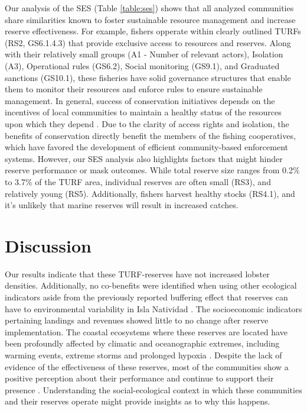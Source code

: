 \documentclass{frontiersSCNS}
\theoremstyle{definition}
\theoremstyle{definition}
\theoremstyle{definition}
\theoremstyle{remark}
\begin{document}
Our analysis of the SES (Table \ref{table:ses}) shows that all analyzed
communities share similarities known to foster sustainable resource
management and increase reserve effectiveness. For example, fishers
opperate within clearly outlined TURFs (RS2, GS6.1.4.3) that provide
exclusive access to resources and reserves. Along with their relatively
small groups (A1 - Number of relevant actors), Isolation (A3),
Operational rules (GS6.2), Social monitoring (GS9.1), and Graduated
sanctions (GS10.1), these fisheries have solid governance structures
that enable them to monitor their resources and enforce rules to ensure
sustainable management. In general, success of conservation initiatives
depends on the incentives of local communities to maintain a healthy
status of the resources upon which they depend \citep{jupiter_2017}. Due
to the clarity of access rights and isolation, the benefits of
conservation directly benefit the members of the fishing cooperatives,
which have favored the development of efficient community-based
enforcement systems. However, our SES analysis also highlights factors
that might hinder reserve performance or mask outcomes. While total
reserve size ranges from 0.2\% to 3.7\% of the TURF area, individual
reserves are often small (RS3), and relatively young (RS5).
Additionally, fishers harvest healthy stocks (RS4.1), and it's unlikely
that marine reserves will result in increased catches.

\section{Discussion}\label{discussion}

Our results indicate that these TURF-reserves have not increased lobster
densities. Additionally, no co-benefits were identified when using other
ecological indicators aside from the previously reported buffering
effect that reserves can have to environmental variability in Isla
Natividad \citep{micheli_2012-EU}. The socioeconomic indicators
pertaining landings and revenues showed little to no change after
reserve implementation. The coastal ecosystems where these reserves are
located have been profoundly affected by climatic and oceanographic
extremes, including warming events, extreme storms and prolonged hypoxia
\citep{micheli_2012-EU,woodson}. Despite the lack of evidence of the
effectiveness of these reserves, most of the communities show a positive
perception about their performance and continue to support their
presence \citep{ayer_2018}. Understanding the social-ecological context
in which these communities and their reserves operate might provide
insights as to why this happens.
\end{document}
